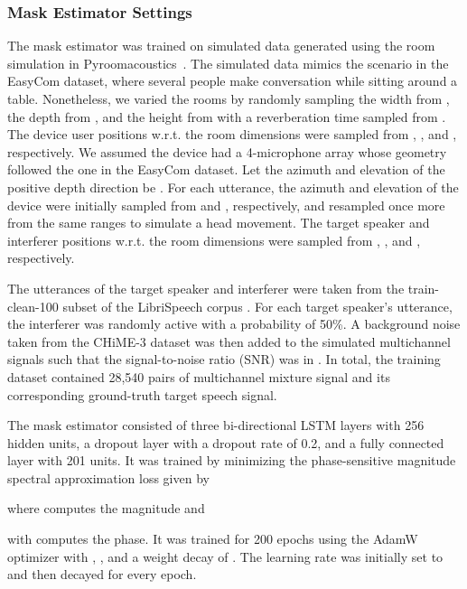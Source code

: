 \documentclass[a4paper]{article}
\begin{document}
\subsubsection{Mask Estimator Settings} \label{sec:mask_system}

The mask estimator was trained on simulated data generated using
the room simulation in Pyroomacoustics~\cite{scheibler_pyroomacoustics_2018}.
The simulated data mimics the scenario in the EasyCom dataset,
where several people make conversation while sitting around a table.
Nonetheless, we varied the rooms by randomly sampling
the width from , 
the depth from , 
and the height from 
with a reverberation time sampled from .
The device user positions w.r.t. the room dimensions were sampled from
,
, and 
, respectively.
We assumed the device had a 4-microphone array
 whose geometry followed the one in the EasyCom dataset.
Let the azimuth and elevation of the positive depth direction be .
For each utterance, the azimuth and elevation of the device were initially sampled from 
 and , respectively,
and resampled once more from the same ranges to simulate a head movement.
The target speaker and interferer positions w.r.t. the room dimensions were sampled from
,
, and 
, respectively.

The utterances of the target speaker and interferer were taken 
 from the train-clean-100 subset of the LibriSpeech corpus \cite{panayotov_librispeech_2015}.
For each target speaker's utterance, the interferer was randomly active with a probability of 50\%.
A background noise taken from the CHiME-3 dataset \cite{barker_third_2015} was then added to the simulated multichannel signals such that the signal-to-noise ratio (SNR) was in .
In total, the training dataset contained 28,540 pairs of
multichannel mixture signal and its corresponding ground-truth target speech signal. 

The mask estimator consisted of three bi-directional LSTM layers with 256 hidden units,
 a dropout layer with a dropout rate of 0.2, 
 and a fully connected layer with 201 units.
It was trained by minimizing
the phase-sensitive magnitude spectral approximation loss \cite{erdogan_phase-sensitive_2015} given by

where
 computes the magnitude and

with
 computes the phase. 
It was trained for 200 epochs
using the AdamW optimizer \cite{loshchilov_decoupled_2019} with
, , and a weight decay of .
The learning rate was initially set to  and then decayed for  every epoch.
\end{document}
